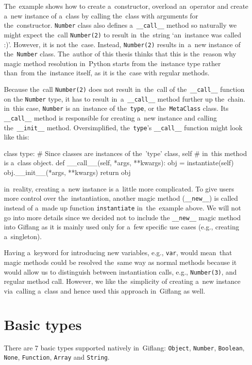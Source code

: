 The~example shows how to create a~constructor, overload an~operator and create a~new instance of a~class by calling the~class with arguments for the~constructor.
\texttt{Number} class also defines a~\texttt{\_\_call\_\_} method so naturally we might expect the~call \texttt{Number(2)} to result in~the~string
`an~instance was called :)'. However, it is not the~case. Instead, \texttt{Number(2)} results in~a~new instance of the~\texttt{Number} class. The~author of this
thesis thinks that this is the~reason why magic method resolution in~Python starts from the~instance type rather than~from the~instance itself, as it is
the~case with regular methods.

Because the~call \texttt{Number(2)} does not result in~the~call of the~\texttt{\_\_call\_\_} function on the
\texttt{Number} type, it has to result in~a~\texttt{\_\_call\_\_} method further up the~chain. in~this case, \texttt{Number} is an~instance of the~\texttt{type},
or the~\texttt{MetaClass} class. Its \texttt{\_\_call\_\_} method is responsible for creating a~new instance and calling the~\texttt{\_\_init\_\_} method. Oversimplified,
the~\texttt{type}'s \texttt{\_\_call\_\_} function might look like this:
\begin{code}
class type:
    # Since classes are instances of the~'type' class, self
    # in~this method is a~class object. 
    def __call__(self, *args, **kwargs):
        obj = instantiate(self)
        obj.__init__(*args, **kwargs)
        return obj
\end{code}

in~reality, creating a~new instance is a~little more complicated. To give users more control over the~instantiation, another magic method (\texttt{\_\_new\_\_})
is called instead of a~made up function \texttt{instantiate} in~the~example above. We will not go into more details since we decided not to include the
\texttt{\_\_new\_\_} magic method into Giflang as it is mainly used only for a~few specific use cases (e.g., creating a~singleton).

Having a~keyword for introducing new variables, e.g., \texttt{var}, would mean~that magic methods could be resolved the~same way as normal methods because
it would allow us to distinguish between instantiation calls, e.g., \texttt{Number(3)}, and regular method call. However,
we like the~simplicity of creating a~new instance via~calling a~class and hence used this approach in~Giflang as well.

\section{Basic types}
There are 7 basic types supported natively in~Giflang: \texttt{Object}, \texttt{Number}, \texttt{Boolean}, \texttt{None}, \texttt{Function},
\texttt{Array} and \texttt{String}.

